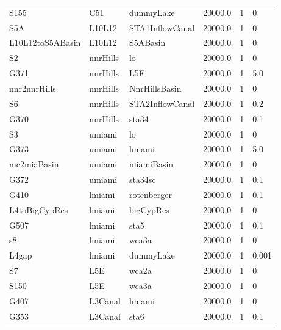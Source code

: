 \begin{table}[!htb]
\begin{center}
\begin{tabular}{p{2.5cm}p{2.5cm}p{2.5cm}p{1.8cm}p{1.5cm}p{1.5cm}}
  S155             &C51             &dummyLake        &20000.0        &1       &0   \\
  S5A              &L10L12          &STA1InflowCanal  &20000.0        &1       &0   \\
  L10L12toS5ABasin &L10L12          &S5ABasin         &20000.0        &1       &0   \\
  S2               &nnrHills        &lo               &20000.0        &1       &0   \\
  G371             &nnrHills        &L5E              &20000.0        &1       &5.0 \\
  nnr2nnrHills     &nnrHills        &NnrHillsBasin    &20000.0        &1       &0   \\
  S6               &nnrHills        &STA2InflowCanal  &20000.0        &1       &0.2 \\
  G370             &nnrHills        &sta34            &20000.0        &1       &0.1 \\
  S3               &umiami          &lo               &20000.0        &1       &0   \\
  G373             &umiami          &lmiami           &20000.0        &1       &5.0 \\
  mc2miaBasin      &umiami          &miamiBasin       &20000.0        &1       &0   \\
  G372             &umiami          &sta34sc          &20000.0        &1       &0.1 \\
  G410             &lmiami          &rotenberger      &20000.0        &1       &0.1 \\
  L4toBigCypRes    &lmiami          &bigCypRes        &20000.0        &1       &0   \\
  G507             &lmiami          &sta5             &20000.0        &1       &0.1 \\
  s8               &lmiami          &wca3a            &20000.0        &1       &0   \\
  L4gap            &lmiami          &dummyLake        &20000.0        &1       &0.001\\
  S7               &L5E             &wca2a            &20000.0        &1       &0   \\
  S150             &L5E             &wca3a            &20000.0        &1       &0   \\
  G407             &L3Canal         &lmiami           &20000.0        &1       &0   \\
  G353             &L3Canal         &sta6             &20000.0        &1       &0.1 \\
  \hline                                                                            
  \end{tabular}
 \end{center}
\end{table}
\normalsize

